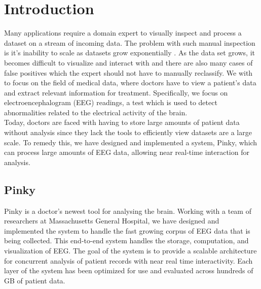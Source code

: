 \chapter{Introduction}\label{intro_ch}

Many applications require a domain expert to visually inspect and process a
dataset on a stream of incoming data. The problem with such manual inspection
is it's inability to scale as datasets grow exponentially \cite{exp-growth}. As
the data set grows, it becomes difficult to visualize and interact with
\cite{immens} and there are also many cases of false positives which the expert
should not have to manually reclassify. We with to focus on the field of
medical data, where doctors have to view a patient's data and extract relevant
information for treatment. Specifically, we focus on electroencephalogram (EEG)
readings, a test which is used to detect abnormalities related to the
electrical activity of the brain. \\

Today, doctors are faced with having to store large amounts of patient data
without analysis since they lack the tools to efficiently view datasets are a
large scale. To remedy this, we have designed and implemented a system, Pinky,
which can process large amounts of EEG data, allowing near real-time
interaction for analysis.


\section{Pinky}

Pinky is a doctor's newest tool for analysing the brain. Working with a team of
researchers at Massachusetts General Hospital, we have designed and implemented
the system to handle the fast growing corpus of EEG data that is being
collected. This end-to-end system handles the storage, computation, and
visualization of EEG. The goal of the system is to provide a scalable
architecture for concurrent analysis of patient records with near real time
interactivity. Each layer of the system has been optimized for use and
evaluated across hundreds of GB of patient data. \\

